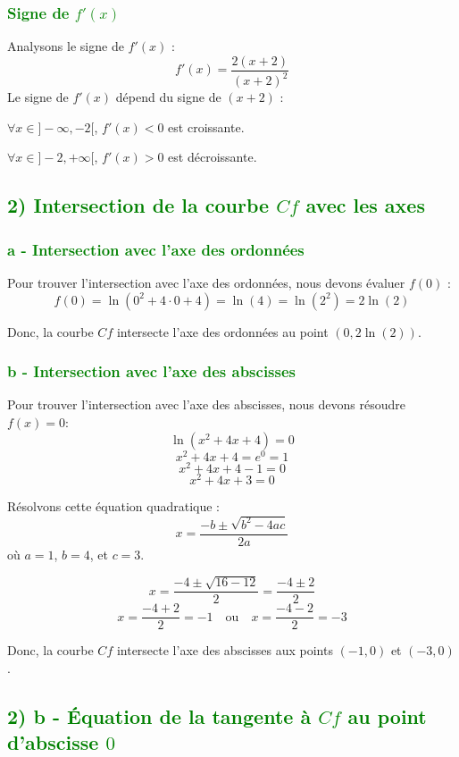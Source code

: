 \documentclass[12pt]{article}
\begin{document}
\subsubsection*{\textcolor{green}{Signe de \( f'(x) \)}}
Analysons le signe de \( f'(x) \) :
\[
f'(x) = \frac{2(x + 2)}{(x + 2)^2}
\]
Le signe de \( f'(x) \) dépend du signe de \( (x + 2) \) :

\(\forall x \in ]-\infty, -2[ \), \( f'(x) < 0 \) est croissante.

\(\forall x \in ]-2, +\infty[ \), \( f'(x) > 0 \) est décroissante.

\subsection*{\textcolor{green}{2) Intersection de la courbe \( Cf \) avec les axes}}

\subsubsection*{\textcolor{green}{a - Intersection avec l'axe des ordonnées}}

Pour trouver l'intersection avec l'axe des ordonnées, nous devons évaluer \( f(0) \) :
\[
f(0) = \ln(0^2 + 4 \cdot 0 + 4) = \ln(4) = \ln(2^2) = 2 \ln(2)
\]

Donc, la courbe \( Cf \) intersecte l'axe des ordonnées au point \((0, 2\ln(2))\).

\subsubsection*{\textcolor{green}{b - Intersection avec l'axe des abscisses}}

Pour trouver l'intersection avec l'axe des abscisses, nous devons résoudre \( f(x) = 0 \):
\[
\ln(x^2 + 4x + 4) = 0
\]
\[
x^2 + 4x + 4 = e^0 = 1
\]
\[
x^2 + 4x + 4 - 1 = 0
\]
\[
x^2 + 4x + 3 = 0
\]

Résolvons cette équation quadratique :
\[
x = \frac{-b \pm \sqrt{b^2 - 4ac}}{2a}
\]
où \( a = 1 \), \( b = 4 \), et \( c = 3 \).

\[
x = \frac{-4 \pm \sqrt{16 - 12}}{2} = \frac{-4 \pm 2}{2}
\]
\[
x = \frac{-4 + 2}{2} = -1 \quad \text{ou} \quad x = \frac{-4 - 2}{2} = -3
\]

Donc, la courbe \( Cf \) intersecte l'axe des abscisses aux points \((-1, 0)\) et \((-3, 0)\).

\subsection*{\textcolor{green}{2) b - Équation de la tangente à \( Cf \) au point d'abscisse \( 0 \)}}
\end{document}
